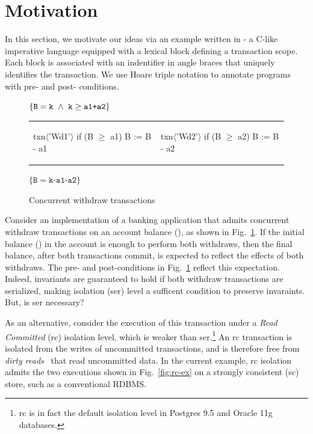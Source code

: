 \section{Motivation}
\label{sec:motivation}

In this section, we motivate our ideas via an example written in
\txnimp - a C-like imperative language equipped with a  lexical
block defining a transaction scope. Each  block is associated
with an indentifier in angle braces that uniquely identifies the
transaction. We use Hoare triple notation to annotate programs with
pre- and post- conditions.

\begin{figure}
\centering
$\{\texttt{B}=\texttt{k} ~\wedge~ \texttt{k}\ge\texttt{a1+a2}\}$
\begin{tabular}{l||l}
\begin{txnimpcode}
  txn$\langle$'Wd1'$\rangle${
    if (B $\ge$ a1) {
      B := B - a1
    }
  }
\end{txnimpcode}
&
\begin{txnimpcode}
  txn$\langle$'Wd2'$\rangle${
    if (B $\ge$ a2) {
      B := B - a2
    }
  }
\end{txnimpcode}
\\
\end{tabular}
$\{\texttt{B}=\texttt{k-a1-a2}\}$
\caption{\small Concurrent withdraw transactions}
\label{fig:motiv-eg-1}
\vspace*{-10pt}
\end{figure}

Consider an implementation of a banking application that admits
concurrent withdraw transactions on an account balance (), as
shown in Fig.~\ref{fig:motiv-eg-1}. If the initial balance () in
the account is enough to perform both withdraws, then the final
balance, after both transactions commit, is expected to reflect the
effects of both withdraws. The pre- and post-conditions in
Fig.~\ref{fig:motiv-eg-1} reflect this expectation. Indeed, invariants
are guaranteed to hold if both withdraw transactions are serialized,
making  isolation ({\sc ser}) level a sufficent
condition to preserve invaraints. But, is {\sc ser} necessary?

As an alternative, consider the execution of this transaction under a
\emph{Read Committed} ({\sc rc}) isolation level, which is weaker than
{\sc ser}.\footnote{{\sc rc} is in fact the default isolation level in
Postgres 9.5 and Oracle 11g databases.} An {\sc rc} transaction is
isolated from the writes of uncommitted transactions, and is therefore
free from \emph{dirty reads}~\cite{berenson} that read uncommitted
data. In the current example, {\sc rc} isolation admits the two
executions shown in Fig.~\ref{fig:rc-ex} on a strongly consistent
({\sc sc}) store, such as a conventional RDBMS.

